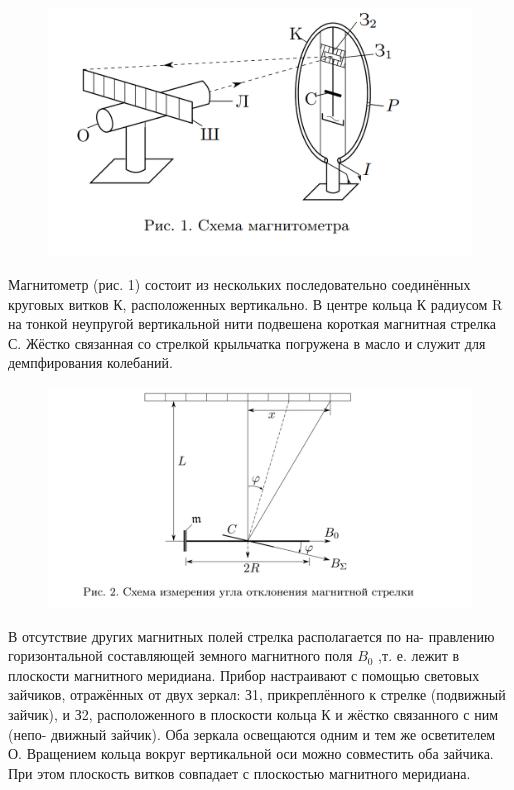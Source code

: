 \documentclass[a4paper,12pt]{article} %
\begin{document}
\begin{figure}[H]
  \centering
  \includegraphics[scale=0.7]{1.png}
  \label{tc}
\end{figure}

Магнитометр (рис. 1) состоит из нескольких последовательно соединённых круговых витков К, расположенных вертикально. В центре кольца К радиусом R на тонкой неупругой вертикальной нити подвешена короткая магнитная стрелка С. Жёстко связанная со стрелкой крыльчатка
погружена в масло и служит для демпфирования колебаний.


\begin{figure}[H]
  \centering
  \includegraphics[scale=0.7]{2.png}
  \label{tc}
\end{figure}

В отсутствие других магнитных полей стрелка располагается по на-
правлению горизонтальной составляющей земного магнитного поля $B_{0}$ ,т. е. лежит в плоскости магнитного меридиана.
Прибор настраивают с помощью световых зайчиков, отражённых от
двух зеркал: З1, прикреплённого к стрелке (подвижный зайчик), и З2, расположенного в плоскости кольца К и жёстко связанного с ним (непо-
движный зайчик). Оба зеркала освещаются одним и тем же осветителем О. Вращением кольца вокруг вертикальной оси можно совместить оба зайчика. При этом плоскость витков совпадает с плоскостью магнитного меридиана.
\end{document}
